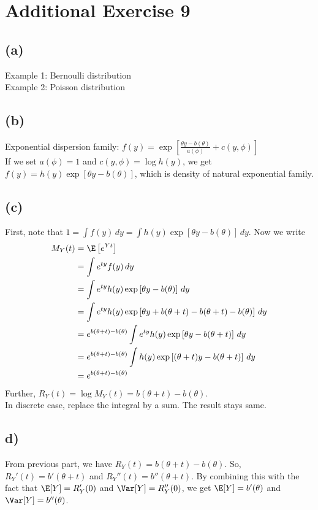 \section*{Additional Exercise 9}
\subsection*{(a)}
Example 1: Bernoulli distribution\\
Example 2: Poisson distribution\\

\subsection*{(b)}
Exponential dispersion family: $f(y) = \exp\left[\frac{\theta y - b(\theta)}{a(\phi)} + c(y,\phi)\right]$\\
If we set $a(\phi) = 1$ and $c(y,\phi) = \log h(y)$, we get $f(y) = h(y)\exp\left[\theta y -b(\theta)\right]$, which is density of natural exponential family.


\subsection*{(c)}
First, note that $1 = \int f(y) \,dy = \int h(y)\exp\left[\theta y -b(\theta)\right] \,dy$. Now we write
\begin{align*}
M_{Y}(t) &= \E\left[e^{Yt}\right]\\
&= \int e^{ty} f(y) \,dy\\
&= \int e^{ty} h(y)\exp\left[\theta y -b(\theta)\right] \,dy\\
&= \int e^{ty} h(y)\exp\left[\theta y + b(\theta + t) - b(\theta + t) -b(\theta)\right] \,dy\\
&= e^{b(\theta + t) -b(\theta)}\int e^{ty} h(y)\exp\left[\theta y -b(\theta + t)\right] \,dy\\
&= e^{b(\theta + t) -b(\theta)}\int h(y)\exp\left[(\theta +t)y -b(\theta + t)\right] \,dy\\
&= e^{b(\theta + t) -b(\theta)}
\end{align*}
Further, $R_{Y}(t) = \log M_{Y}(t) = b(\theta + t) -b(\theta)$.\\
In discrete case, replace the integral by a sum. The result stays same.

\subsection*{d)}
From previous part, we have $R_{Y}(t) = b(\theta + t) -b(\theta)$.
So, $R_{Y}'(t) = b'(\theta + t)$ and $R_{Y}''(t) = b''(\theta + t)$. By combining this with the fact that $\E[Y] = R_{Y}'(0)$ and $\Var[Y] = R_{Y}''(0)$, we get $\E[Y] = b'(\theta)$ and  $\Var[Y] = b''(\theta)$.
